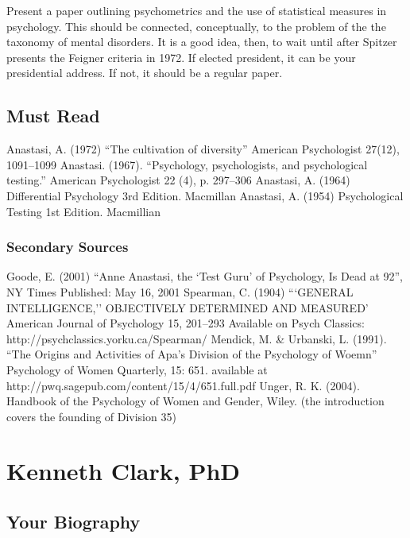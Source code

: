 Present a paper outlining psychometrics and the use of statistical measures in psychology. This should be connected, conceptually, to the problem of the the taxonomy of mental disorders. It is a good idea, then, to wait until after Spitzer presents the Feigner criteria in 1972. If elected president, it can be your presidential address. If not, it should be a regular paper.

\section{Must Read}
\label{mustread}

Anastasi, A. (1972) “The cultivation of diversity” American Psychologist 27(12), 1091--1099
Anastasi. (1967). “Psychology, psychologists, and psychological testing.” American Psychologist 22 (4), p. 297--306
Anastasi, A. (1964) Differential Psychology 3rd Edition. Macmillan
Anastasi, A. (1954) Psychological Testing 1st Edition. Macmillian

\subsection{Secondary Sources}
\label{secondarysources}

Goode, E. (2001) “Anne Anastasi, the `Test Guru' of Psychology, Is Dead at 92”, NY Times Published: May 16, 2001
Spearman, C. (1904) ```GENERAL INTELLIGENCE,'' OBJECTIVELY DETERMINED AND MEASURED' American Journal of Psychology 15, 201--293 Available on Psych Classics: http:\slash \slash psychclassics.yorku.ca\slash Spearman\slash 
Mendick, M. \& Urbanski, L. (1991). “The Origins and Activities of Apa's Division of the Psychology of Woemn” Psychology of Women Quarterly, 15: 651. available at http:\slash \slash pwq.sagepub.com\slash content\slash 15\slash 4\slash 651.full.pdf
Unger, R. K. (2004). Handbook of the Psychology of Women and Gender, Wiley. (the introduction covers the founding of Division 35)

\chapter{Kenneth Clark, PhD}
\label{kennethclarkphd}

\section{Your Biography}
\label{yourbiography}

